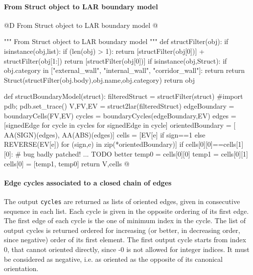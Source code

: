 \documentclass[11pt,oneside]{article}    %
\begin{document}
\paragraph{From Struct object to LAR boundary model}
@D From Struct object to LAR boundary model
@{""" From Struct object to LAR boundary model """
def structFilter(obj):
    if isinstance(obj,list):
        if (len(obj) > 1):
            return [structFilter(obj[0])] + structFilter(obj[1:])
        return [structFilter(obj[0])]
    if isinstance(obj,Struct):
        if obj.category in ["external_wall", "internal_wall", "corridor_wall"]:
            return
        return Struct(structFilter(obj.body),obj.name,obj.category)
    return obj

def structBoundaryModel(struct):
    filteredStruct = structFilter(struct)
    #import pdb; pdb.set_trace()
    V,FV,EV = struct2lar(filteredStruct)
    edgeBoundary = boundaryCells(FV,EV)
    cycles = boundaryCycles(edgeBoundary,EV)
    edges = [signedEdge for cycle in cycles for signedEdge in cycle]
    orientedBoundary = [ AA(SIGN)(edges), AA(ABS)(edges)]
    cells = [EV[e] if sign==1 else REVERSE(EV[e]) for (sign,e) in zip(*orientedBoundary)]
    if cells[0][0]==cells[1][0]: # bug badly patched! ... TODO better
        temp0 = cells[0][0]
        temp1 = cells[0][1]
        cells[0] = [temp1, temp0]
    return V,cells
@}
    

\paragraph{Edge cycles associated to a closed chain of edges}

The output \texttt{cycles} are returned as lists of oriented edges, given in consecutive  sequence in each list. Each cycle is given in the opposite ordering of its first edge.
The first edge of each cycle is the one of minimum index in the cycle. The list of output cycles is returned ordered for increasing (or better, in decreasing order, since negative) order of its first element. The first output cycle starts from index 0, that cannot oriented directly, since -0 is not allowed for integer indices. It must be considered as negative, i.e. as oriented as the opposite of its canonical orientation. 
\end{document}
